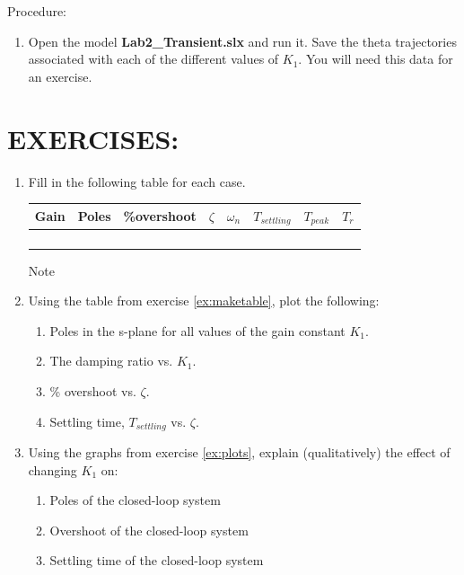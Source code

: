\documentclass[11pt,a4paper]{article}
\begin{document}
Procedure:
\begin{enumerate}
\item Open the model \textbf{Lab2\_Transient.slx} and run it. Save the theta trajectories associated with each of the different values of $K_{1}$. You will need this data for an exercise.
\end{enumerate}

\section{EXERCISES:}
\begin{enumerate} 
\item \label{ex:maketable} Fill in the following table for each case.
\begin{center}
\begin{tabular}{|c|c|c|c|c|c|c|c|}
\hline
Gain & Poles & \%overshoot & $\zeta$ & $\omega_{n}$ & $T_{settling}$ & $T_{peak}$ & $T_{r}$ \\ \hline
\qquad \qquad & \qquad \qquad & \qquad \qquad & \qquad \qquad & \qquad \qquad & \qquad \qquad & \qquad \qquad & \qquad \qquad \\ \hline 
\qquad \qquad & \qquad \qquad & \qquad \qquad & \qquad \qquad & \qquad \qquad & \qquad \qquad & \qquad \qquad & \qquad \qquad \\ \hline 
\qquad \qquad & \qquad \qquad & \qquad \qquad & \qquad \qquad & \qquad \qquad & \qquad \qquad & \qquad \qquad & \qquad \qquad \\ \hline 
\qquad \qquad & \qquad \qquad & \qquad \qquad & \qquad \qquad & \qquad \qquad & \qquad \qquad & \qquad \qquad & \qquad \qquad \\ \hline 

\end{tabular}
\end{center}

Note

\item \label{ex:plots} Using the table from exercise \ref{ex:maketable}, plot the following:
\begin{enumerate}
\item Poles in the s-plane for all values of the gain constant $K_{1}$.
\item The damping ratio vs. $K_{1}$.
\item \% overshoot vs. $\zeta$.
\item Settling time, $T_{settling}$ vs. $\zeta$.
\end{enumerate}

\item Using the graphs from exercise \ref{ex:plots}, explain (qualitatively) the effect of changing $K_{1}$ on:
\begin{enumerate}
\item Poles of the closed-loop system
\item Overshoot of the closed-loop system
\item Settling time of the closed-loop system
\end{enumerate}

\end{enumerate}
\end{document}

